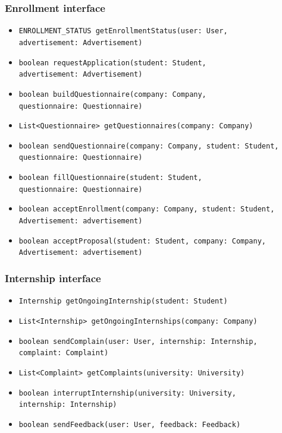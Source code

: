 \subsubsection{Enrollment interface}
\begin{itemize}
    \item \verb|ENROLLMENT_STATUS getEnrollmentStatus(user: User, | \\ \makebox[10em][l]{} \verb|advertisement: Advertisement)|
    \item \verb|boolean requestApplication(student: Student, | \\ \makebox[10em][l]{} \verb|advertisement: Advertisement)|
    \item \verb|boolean buildQuestionnaire(company: Company, | \\ \makebox[10em][l]{} \verb|questionnaire: Questionnaire)|
    \item \verb|List<Questionnaire> getQuestionnaires(company: Company)|
    \item \verb|boolean sendQuestionnaire(company: Company, student: Student, | \\ \makebox[10em][l]{} \verb|questionnaire: Questionnaire)|
    \item \verb|boolean fillQuestionnaire(student: Student, | \\ \makebox[10em][l]{} \verb|questionnaire: Questionnaire)|
    \item \verb|boolean acceptEnrollment(company: Company, student: Student, | \\ \makebox[10em][l]{} \verb|Advertisement: advertisement)|
    \item \verb|boolean acceptProposal(student: Student, company: Company, | \\ \makebox[10em][l]{} \verb|Advertisement: advertisement)|
\end{itemize}

\subsubsection{Internship interface}
\begin{itemize}
    \item \verb|Internship getOngoingInternship(student: Student)|
    \item \verb|List<Internship> getOngoingInternships(company: Company)|
    \item \verb|boolean sendComplain(user: User, internship: Internship, | \\ \makebox[10em][l]{} \verb|complaint: Complaint)|
    \item \verb|List<Complaint> getComplaints(university: University)|
    \item \verb|boolean interruptInternship(university: University, | \\ \makebox[10em][l]{} \verb|internship: Internship)|
    \item \verb|boolean sendFeedback(user: User, feedback: Feedback)|
\end{itemize}

